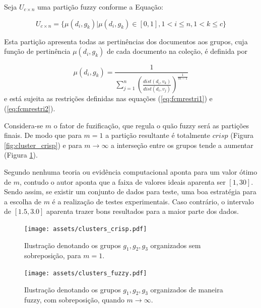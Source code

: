Seja $U_{c \times n}$ uma partição fuzzy conforme a Equação:

\begin{equation} 
  U_{c \times n} = \{\mu(d_i, g_k) |\mu(d_i, g_k) \in [0,1], 1 < i \leq n, 1 < k \leq c\} 
  \label{eq:part_fuzzy} 
\end{equation} 

Esta partição apresenta todas as pertinências dos documentos aos grupos, cuja função de 
pertinência $\mu(d_i,g_k)$ de cada documento na coleção, é definida por 

\begin{equation} 
  \mu(d_i,g_k) = \frac{1}{\sum_{j=1}^n(\frac{dist(d_i,v_k)}{dist(d_i,v_j)})^{\frac{1}{m-1}}} 
  \label{eq:pertinencia}
\end{equation}
e está sujeita as restrições definidas nas equações (\ref{eq:fcmrestri1}) e (\ref{eq:fcmrestri2}).

Considera-se $m$ o fator de fuzificação, que regula o quão fuzzy será as partições finais. De modo
que para $m = 1$ a partição resultante é totalmente $crisp$ (Figura \ref{fig:cluster_crisp}) e para
$m \rightarrow \infty$ a interseção entre os grupos tende a aumentar (Figura
\ref{fig:cluster_fuzzy})\cite{Pal2005}. 

Segundo  nenhuma teoria ou evidência computacional aponta para um valor ótimo
de $m$, contudo o autor aponta que a faixa de valores ideais aparenta ser $[1,30]$. Sendo assim, se
existir um conjunto de dados para teste, uma boa estratégia para a escolha de $m$ é a realização de
testes experimentais. Caso contrário, o intervalo de $[1.5, 3.0]$ aparenta trazer bons resultados
para a maior parte dos dados.

\begin{figure}[!htp] \centering 
   \begin{minipage}{0.45\textwidth} 
     \centering
    \texttt{[image: assets/clusters\_crisp.pdf]} 
    \caption{Ilustração denotando os
grupos $g_1,g_2,g_3$ organizados sem sobreposição, para $m = 1$.} 
  \label{fig:cluster_crisp}
  \end{minipage}\hfill 
  \begin{minipage}{0.45\textwidth} \centering
    \texttt{[image: assets/clusters\_fuzzy.pdf]} 
    \caption{Ilustração denotando os
     grupos $g_1,g_2,g_3$ organizados de maneira fuzzy, com sobreposição, quando 
     $m \rightarrow \infty$.}
     \label{fig:cluster_fuzzy} 
   \end{minipage} 
\end{figure}

